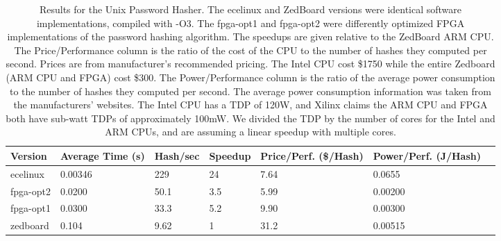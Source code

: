\begin{table}[h]
\centering
\begin{tabular}{@{}lllllll@{}}
\toprule
  Version   & Average Time (s) & Hash/sec & Speedup & Price/Perf. (\$/Hash) & Power/Perf. (J/Hash) \\ \midrule
  ecelinux  & 0.00346          & 229      & 24      & 7.64  & 0.0655                        \\
  fpga-opt2 & 0.0200           & 50.1     & 3.5     & 5.99  & 0.00200                       \\
  fpga-opt1 & 0.0300           & 33.3     & 5.2     & 9.90  & 0.00300                       \\
  zedboard  & 0.104            & 9.62     & 1       & 31.2  & 0.00515                       \\ \bottomrule
\end{tabular}
\caption {Results for the Unix Password Hasher. The ecelinux and ZedBoard versions were identical software
  implementations, compiled with -O3. The fpga-opt1 and fpga-opt2 were differently optimized FPGA
  implementations of the password hashing algorithm. The speedups are given relative to the ZedBoard ARM
  CPU. The Price/Performance column is the ratio of the cost of the CPU to the number of hashes they computed
  per second. Prices are from manufacturer's recommended pricing. The Intel CPU cost \$1750 while the
  entire Zedboard (ARM CPU and FPGA) cost \$300. The Power/Performance column is the ratio of the average
  power consumption to the number of hashes they computed per second. The average power consumption
  information was taken from the manufacturers' websites. The Intel CPU has a TDP of 120W, and Xilinx 
  claims the ARM CPU and FPGA both have sub-watt TDPs of approximately 100mW. We divided the TDP by the
  number of cores for the Intel and ARM CPUs, and are assuming a linear speedup with multiple cores.}
\label{table:hashresults}
\end{table}

